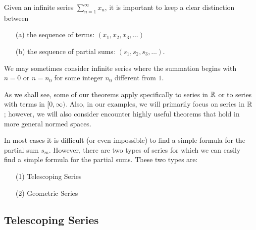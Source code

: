 \documentclass[a4paper]{article}
\begin{document}
\begin{remark}[1]
    Given an infinite series \( \sum_{ n=1  }^{ \infty  } {x}_{n}  \), it is important to keep a clear distinction between
    \begin{enumerate}
        \item[(a)] the sequence of terms: \( ({x}_{1}, {x}_{2}, {x}_{3}, \dots ) \)
        \item[(b)] the sequence of partial sums: \( ({s}_{1}, {s}_{2}, {s}_{3}, \dots ) \).
    \end{enumerate}
\end{remark}

\begin{remark}[2]
    We may sometimes consider infinite series where the summation begins with \( n = 0  \) or \( n = {n}_{0} \) for some integer \( {n}_{0}  \) different from \( 1  \).
\end{remark}

As we shall see, some of our theorems apply specifically to series in \( \mathbb{R}  \) or to series with terms in \( [0,\infty) \). Also, in our examples, we will primarily focus on series in \( \mathbb{R}  \); however, we will also consider encounter highly useful theorems that hold in more general normed spaces.  

In most cases it is difficult (or even impossible)  to find a simple formula for the partial sum \( {s}_{m} \). However, there are two types of series for which we can easily find a simple formula for the partial sums. These two types are:
\begin{enumerate}
    \item[(1)] Telescoping Series
    \item[(2)] Geometric Series
\end{enumerate}


\subsection{Telescoping Series}
\end{document}
